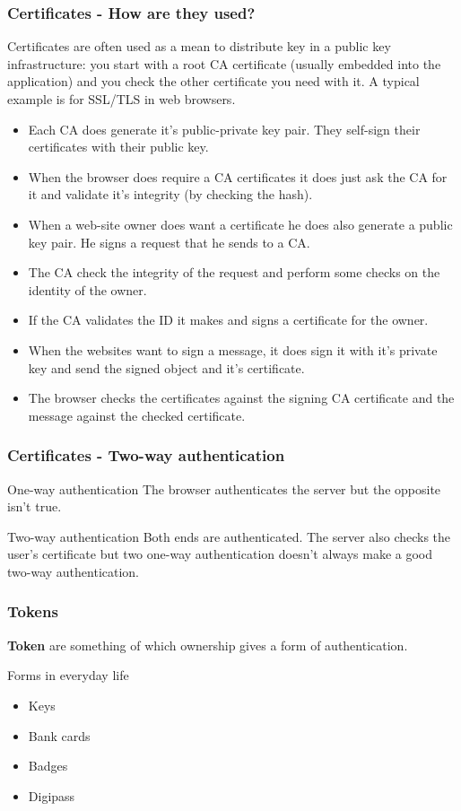 \begin{frame}[allowframebreaks]
\frametitle{Certificates - How are they used?}
Certificates are often used as a mean to distribute key in a public
key infrastructure: you start with a root CA certificate (usually
embedded into the application) and you check
the other certificate you need with it. A typical example is for
SSL/TLS in web browsers.
\begin{itemize}
\item Each CA does generate it's public-private key pair. They
  self-sign their certificates with their public key.
\item When the browser does require a CA certificates it does just ask
  the CA for it and validate it's integrity (by checking the hash).
\item When a web-site owner does want a certificate he does also
  generate a public key pair. He signs a request that he sends to a
  CA.
\item The CA check the integrity of the request and perform some
  checks on the identity of the owner.
\item If the CA validates the ID it makes and signs a certificate for
  the owner. 
\item When the websites want to sign a message, it does sign it with
  it's private key and send the signed object and it's certificate.
\item The browser checks the certificates against the signing CA
  certificate and the message against the checked certificate.
\end{itemize}
\end{frame}

\begin{frame}
\frametitle{Certificates - Two-way authentication}
\begin{block}{One-way authentication}
The browser authenticates the server but the opposite isn't true.
\end{block}
\begin{block}{Two-way authentication}
Both ends are authenticated.
The server also checks the user's certificate but two one-way
authentication doesn't always make a good two-way authentication.
\end{block}
\end{frame}

\begin{frame}
\frametitle{Tokens}
\textbf{Token} are something of which ownership gives a form of
authentication.
\begin{exampleblock}{Forms in everyday life}
\begin{itemize}
\item Keys
\item Bank cards
\item Badges
\item Digipass
\end{itemize}
\end{exampleblock}
\end{frame}

